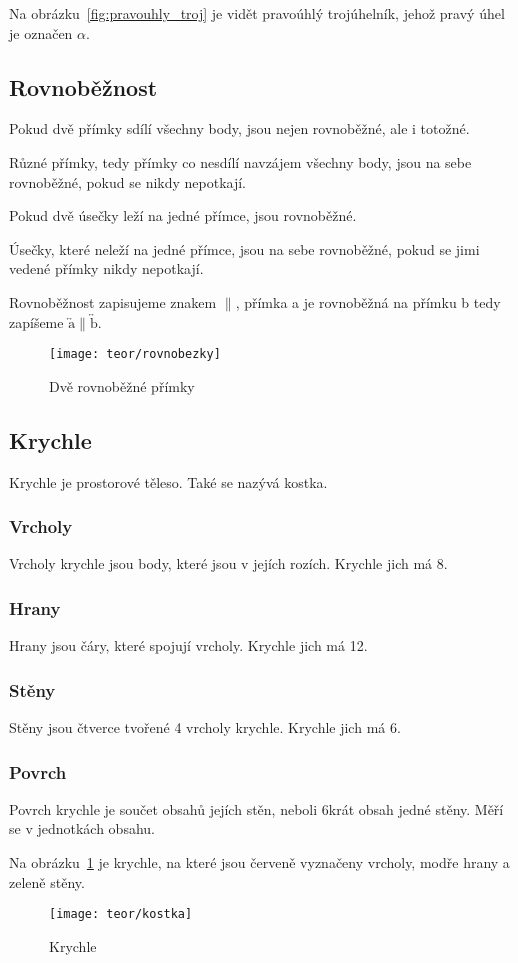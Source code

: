 Na obrázku~\ref{fig:pravouhly_troj} je vidět pravoúhlý trojúhelník, jehož pravý úhel je označen $\alpha$.

\subsection{Rovnoběžnost}
Pokud dvě přímky sdílí všechny body, jsou nejen rovnoběžné, ale i totožné.

Různé přímky, tedy přímky co nesdílí navzájem všechny body, jsou na sebe rovnoběžné, pokud se nikdy nepotkají.

Pokud dvě úsečky leží na jedné přímce, jsou rovnoběžné.

Úsečky, které neleží na jedné přímce, jsou na sebe rovnoběžné, pokud se jimi vedené přímky nikdy nepotkají.

Rovnoběžnost zapisujeme znakem $\|$, přímka a je rovnoběžná na přímku b tedy zapíšeme $\overleftrightarrow{\text{a}} \| \overleftrightarrow{\text{b}}$.
\begin{figure}[h]
    \centering
    \texttt{[image: teor/rovnobezky]}
    \caption{Dvě rovnoběžné přímky}
\end{figure}

\subsection{Krychle}
Krychle je prostorové těleso. Také se nazývá kostka.

\subsubsection{Vrcholy}
Vrcholy krychle jsou body, které jsou v jejích rozích. Krychle jich má 8.

\subsubsection{Hrany}
Hrany jsou čáry, které spojují vrcholy. Krychle jich má 12.

\subsubsection{Stěny}
Stěny jsou čtverce tvořené 4 vrcholy krychle. Krychle jich má 6.

\subsubsection{Povrch}
Povrch krychle je součet obsahů jejích stěn, neboli 6krát obsah jedné stěny. Měří se v jednotkách obsahu.

Na obrázku~\ref{fig:krychle} je krychle, na které jsou červeně vyznačeny vrcholy, modře hrany a zeleně stěny.

\begin{figure}[h]
    \centering
    \texttt{[image: teor/kostka]}
    \caption{Krychle}
    \label{fig:krychle}
\end{figure}


